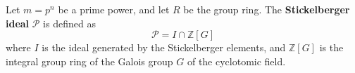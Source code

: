 Let $m = p^n$ be a prime power, and let $R$ be the group ring. The \textbf{Stickelberger ideal} $\mathcal{P}$ is defined as
$$\mathcal{P} = I \cap \mathbb{Z}[G]$$
where $I$ is the ideal generated by the Stickelberger elements, and $\mathbb{Z}[G]$ is the integral group ring of the Galois group $G$ of the cyclotomic field.
